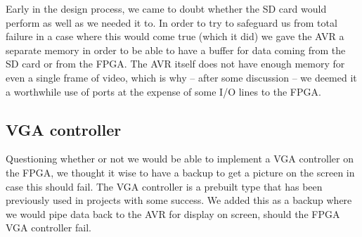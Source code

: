 Early in the design process, we came to doubt whether the \ac{SD} card would perform as well as we needed it to. In order to try to safeguard us from total failure in a case where this would come true (which it did) we gave the AVR a separate memory in order to be able to have a buffer for data coming from the \ac{SD} card or from the \ac{FPGA}. The AVR itself does not have enough memory for even a single frame of video, which is why -- after some discussion -- we deemed it a worthwhile use of ports at the expense of some \ac{I/O} lines to the FPGA.

\subsection{\ac{VGA} controller}

Questioning whether or not we would be able to implement a \ac{VGA} controller
on the \ac{FPGA}, we thought it wise to have a backup to get a picture on the
screen in case this should fail. The \ac{VGA} controller is a prebuilt type that
has been previously used in projects with some success. We added this as a
backup where we would pipe data back to the AVR for display on screen, should
the \ac{FPGA} \ac{VGA} controller fail.


